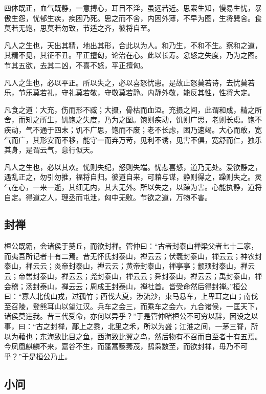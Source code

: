 \documentclass[]{article}
\begin{document}
四体既正，血气既静，一意搏心，耳目不淫，虽远若近。思索生知，慢易生忧，暴傲生怨，忧郁生疾，疾困乃死。思之而不舍，内困外薄，不早为图，生将巽舍。食莫若无饱，思莫若勿致，节适之齐，彼将自至。

凡人之生也，天出其精，地出其形，合此以为人。和乃生，不和不生。察和之道，其精不见，其征不丑。平正擅匈，论治在心。此以长寿。忿怒之失度，乃为之图。节其五欲，去其二凶，不喜不怒，平正擅匈。

凡人之生也，必以平正。所以失之，必以喜怒忧患。是故止怒莫若诗，去忧莫若乐，节乐莫若礼，守礼莫若敬，守敬莫若静。内静外敬，能反其性，性将大定。

凡食之道：大充，伤而形不臧；大摄，骨枯而血沍。充摄之间，此谓和成，精之所舍，而知之所生，饥饱之失度，乃为之图。饱则疾动，饥则广思，老则长虑。饱不疾动，气不通于四末；饥不广思，饱而不废；老不长虑，困乃速竭。大心而敢，宽气而广，其形安而不移，能守一而弃万苛，见利不诱，见害不俱，宽舒而仁，独乐其身，是谓云气，意行似天。

凡人之生也，必以其欢。忧则失纪，怒则失端。忧悲喜怒，道乃无处。爱欲静之，遇乱正之，勿引勿推，福将自归。彼道自来，可藉与谋，静则得之，躁则失之。灵气在心，一来一逝，其细无内，其大无外。所以失之，以躁为害。心能执静，道将自定。得道之人，理丞而屯泄，匈中无败。节欲之道，万物不害。

\hypertarget{header-n648}{%
\subsection{封禅}\label{header-n648}}

桓公既霸，会诸侯于葵丘，而欲封禅。管仲曰：``古者封泰山禅梁父者七十二家，而夷吾所记者十有二焉。昔无怀氏封泰山，禅云云；伏羲封泰山，禅云云；神农封泰山，禅云云；炎帝封泰山，禅云云；黄帝封泰山，禅亭亭；颛顼封泰山，禅云云；帝喾封泰山，禅云云；尧封泰山，禅云云；舜封泰山，禅云云；禹封泰山，禅会稽；汤封泰山，禅云云；周成王封泰山，禅社首。皆受命然后得封禅。''桓公曰：``寡人北伐山戎，过孤竹；西伐大夏，涉流沙，束马悬车，上卑耳之山；南伐至召陵，登熊耳山以望江汉。兵车之会三，而乘车之会六，九合诸侯，一匡天下，诸侯莫违我。昔三代受命，亦何以异乎？''于是管仲睹桓公不可穷以辞，因设之以事，曰：``古之封禅，鄗上之黍，北里之禾，所以为盛；江淮之间，一茅三脊，所以为藉也；东海致比目之鱼，西海致比翼之鸟，然后物有不召而自至者十有五焉。今凤凰麒麟不来，嘉谷不生，而蓬蒿藜莠茂，鸱枭数至，而欲封禅，毋乃不可乎？''于是桓公乃止。

\hypertarget{header-n652}{%
\subsection{小问}\label{header-n652}}
\end{document}
